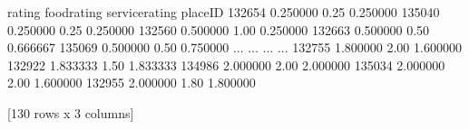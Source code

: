 \documentclass[letterpaper,10pt,english]{jupyterBook}
\begin{document}
\begin{sphinxVerbatim}[commandchars=\\\{\}]
           rating  food\PYGZus{}rating  service\PYGZus{}rating
placeID                                       
132654   0.250000         0.25        0.250000
135040   0.250000         0.25        0.250000
132560   0.500000         1.00        0.250000
132663   0.500000         0.50        0.666667
135069   0.500000         0.50        0.750000
...           ...          ...             ...
132755   1.800000         2.00        1.600000
132922   1.833333         1.50        1.833333
134986   2.000000         2.00        2.000000
135034   2.000000         2.00        1.600000
132955   2.000000         1.80        1.800000

[130 rows x 3 columns]
\end{sphinxVerbatim}

\begin{sphinxVerbatim}[commandchars=\\\{\}]
  
\end{sphinxVerbatim}

\begin{sphinxVerbatim}[commandchars=\\\{\}]
     
\end{sphinxVerbatim}
\end{document}
